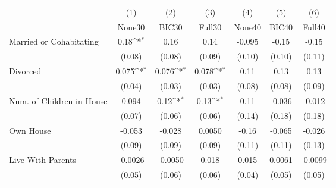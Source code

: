 {
\def\sym#1{\ifmmode^{#1}\else\(^{#1}\)\fi}
\begin{tabular}{l*{6}{c}}
\toprule
            &\multicolumn{1}{c}{(1)}&\multicolumn{1}{c}{(2)}&\multicolumn{1}{c}{(3)}&\multicolumn{1}{c}{(4)}&\multicolumn{1}{c}{(5)}&\multicolumn{1}{c}{(6)}\\
            &\multicolumn{1}{c}{None30}&\multicolumn{1}{c}{BIC30}&\multicolumn{1}{c}{Full30}&\multicolumn{1}{c}{None40}&\multicolumn{1}{c}{BIC40}&\multicolumn{1}{c}{Full40}\\
\midrule
Married or Cohabitating&        0.18\sym{*}  &        0.16         &        0.14         &      -0.095         &       -0.15         &       -0.15         \\
            &      (0.08)         &      (0.08)         &      (0.09)         &      (0.10)         &      (0.10)         &      (0.11)         \\
\addlinespace
Divorced    &       0.075\sym{*}  &       0.076\sym{*}  &       0.078\sym{*}  &        0.11         &        0.13         &        0.13         \\
            &      (0.04)         &      (0.03)         &      (0.03)         &      (0.08)         &      (0.08)         &      (0.09)         \\
\addlinespace
Num. of Children in House&       0.094         &        0.12\sym{*}  &        0.13\sym{*}  &        0.11         &      -0.036         &      -0.012         \\
            &      (0.07)         &      (0.06)         &      (0.06)         &      (0.14)         &      (0.18)         &      (0.18)         \\
\addlinespace
Own House   &      -0.053         &      -0.028         &      0.0050         &       -0.16         &      -0.065         &      -0.026         \\
            &      (0.09)         &      (0.09)         &      (0.09)         &      (0.11)         &      (0.11)         &      (0.13)         \\
\addlinespace
Live With Parents&     -0.0026         &     -0.0050         &       0.018         &       0.015         &      0.0061         &     -0.0099         \\
            &      (0.05)         &      (0.06)         &      (0.06)         &      (0.04)         &      (0.05)         &      (0.05)         \\
\bottomrule
\end{tabular}
}
